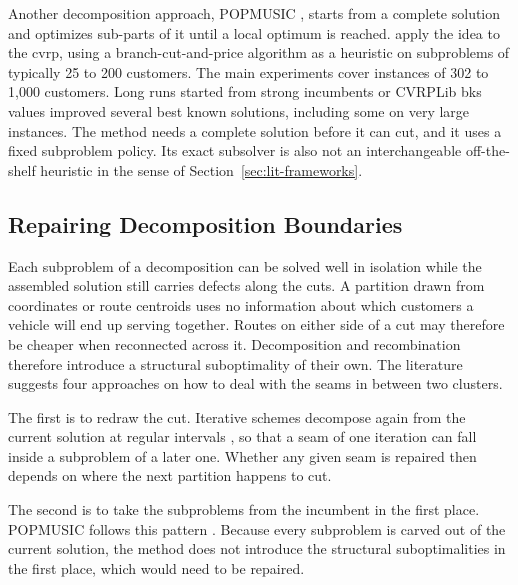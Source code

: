 Another decomposition approach, POPMUSIC \citep{taillard2002popmusic}, starts from a complete solution and optimizes sub-parts of it until a local optimum is reached. \citet{queirogaPOPMUSICMatheuristic2021} apply the idea to the \gls{cvrp}, using a branch-cut-and-price algorithm as a heuristic on subproblems of typically 25 to 200 customers. The main experiments cover instances of 302 to 1{,}000 customers. Long runs started from strong incumbents or CVRPLib \gls{bks} values improved several best known solutions, including some on very large instances. The method needs a complete solution before it can cut, and it uses a fixed subproblem policy. Its exact subsolver is also not an interchangeable off-the-shelf heuristic in the sense of Section~\ref{sec:lit-frameworks}.

\subsection{Repairing Decomposition Boundaries}\label{sec:lit-boundary-repair}

Each subproblem of a decomposition can be solved well in isolation while the assembled solution still carries defects along the cuts. A partition drawn from coordinates or route centroids uses no information about which customers a vehicle will end up serving together. Routes on either side of a cut may therefore be cheaper when reconnected across it. Decomposition and recombination therefore introduce a structural suboptimality of their own. The literature suggests four approaches on how to deal with the seams in between two clusters.

The first is to redraw the cut. Iterative schemes decompose again from the current solution at regular intervals \citep{bent2010spatial,santiniDecompositionStrategiesVehicle2023}, so that a seam of one iteration can fall inside a subproblem of a later one. Whether any given seam is repaired then depends on where the next partition happens to cut.

The second is to take the subproblems from the incumbent in the first place. POPMUSIC follows this pattern \citep{queirogaPOPMUSICMatheuristic2021,taillard2002popmusic}. Because every subproblem is carved out of the current solution, the method does not introduce the structural suboptimalities in the first place, which would need to be repaired.

